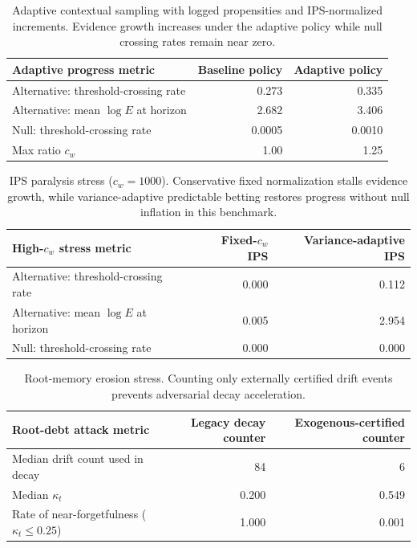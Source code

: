 \documentclass[11pt,a4paper]{article}
\begin{document}
\begin{table}[H]
\centering
\small
\begin{tabular}{lrr}
\toprule
Adaptive progress metric & Baseline policy & Adaptive policy \\
\midrule
Alternative: threshold-crossing rate & 0.273 & 0.335 \\
Alternative: mean $\log E$ at horizon & 2.682 & 3.406 \\
Null: threshold-crossing rate & 0.0005 & 0.0010 \\
Max ratio $c_w$ & 1.00 & 1.25 \\
\bottomrule
\end{tabular}
\caption{Adaptive contextual sampling with logged propensities and IPS-normalized increments. Evidence growth increases under the adaptive policy while null crossing rates remain near zero.}
\end{table}

\begin{table}[H]
\centering
\small
\begin{tabular}{lrr}
\toprule
High-$c_w$ stress metric & Fixed-$c_w$ IPS & Variance-adaptive IPS \\
\midrule
Alternative: threshold-crossing rate & 0.000 & 0.112 \\
Alternative: mean $\log E$ at horizon & 0.005 & 2.954 \\
Null: threshold-crossing rate & 0.000 & 0.000 \\
\bottomrule
\end{tabular}
\caption{IPS paralysis stress ($c_w=1000$). Conservative fixed normalization stalls evidence growth, while variance-adaptive predictable betting restores progress without null inflation in this benchmark.}
\end{table}

\begin{table}[t]
\centering
\small
\begin{tabular}{lrr}
\toprule
Root-debt attack metric & Legacy decay counter & Exogenous-certified counter \\
\midrule
Median drift count used in decay & 84 & 6 \\
Median $\kappa_t$ & 0.200 & 0.549 \\
Rate of near-forgetfulness ($\kappa_t\le 0.25$) & 1.000 & 0.001 \\
\bottomrule
\end{tabular}
\caption{Root-memory erosion stress. Counting only externally certified drift events prevents adversarial decay acceleration.}
\end{table}
\end{document}
